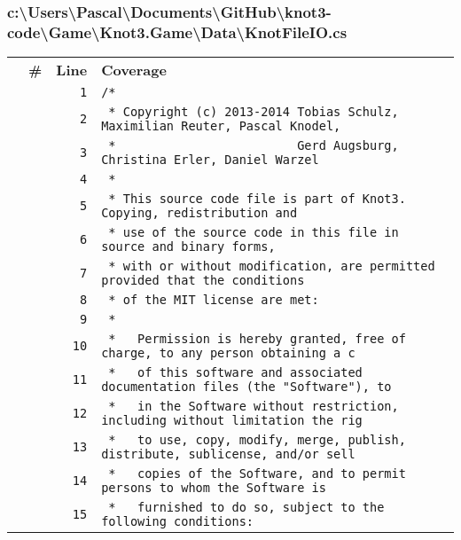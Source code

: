 \documentclass[a4paper,10pt]{article}
\begin{document}
\subsubsection{c:\textbackslash Users\textbackslash Pascal\textbackslash Documents\textbackslash GitHub\textbackslash knot3-code\textbackslash Game\textbackslash Knot3.Game\textbackslash Data\textbackslash KnotFileIO.cs}
\begin{longtable}[l]{lrrl}
\textbf{} & \textbf{\#} & \textbf{Line} & \textbf{Coverage}\\
\cellcolor{gray} &  & \verb~1~ & \verb~/*~\\
\cellcolor{gray} &  & \verb~2~ & \verb~ * Copyright (c) 2013-2014 Tobias Schulz, Maximilian Reuter, Pascal Knodel,~\\
\cellcolor{gray} &  & \verb~3~ & \verb~ *                         Gerd Augsburg, Christina Erler, Daniel Warzel~\\
\cellcolor{gray} &  & \verb~4~ & \verb~ *~\\
\cellcolor{gray} &  & \verb~5~ & \verb~ * This source code file is part of Knot3. Copying, redistribution and~\\
\cellcolor{gray} &  & \verb~6~ & \verb~ * use of the source code in this file in source and binary forms,~\\
\cellcolor{gray} &  & \verb~7~ & \verb~ * with or without modification, are permitted provided that the conditions~\\
\cellcolor{gray} &  & \verb~8~ & \verb~ * of the MIT license are met:~\\
\cellcolor{gray} &  & \verb~9~ & \verb~ *~\\
\cellcolor{gray} &  & \verb~10~ & \verb~ *   Permission is hereby granted, free of charge, to any person obtaining a c~\\
\cellcolor{gray} &  & \verb~11~ & \verb~ *   of this software and associated documentation files (the "Software"), to ~\\
\cellcolor{gray} &  & \verb~12~ & \verb~ *   in the Software without restriction, including without limitation the rig~\\
\cellcolor{gray} &  & \verb~13~ & \verb~ *   to use, copy, modify, merge, publish, distribute, sublicense, and/or sell~\\
\cellcolor{gray} &  & \verb~14~ & \verb~ *   copies of the Software, and to permit persons to whom the Software is~\\
\cellcolor{gray} &  & \verb~15~ & \verb~ *   furnished to do so, subject to the following conditions:~\\

\end{longtable}
\end{document}
